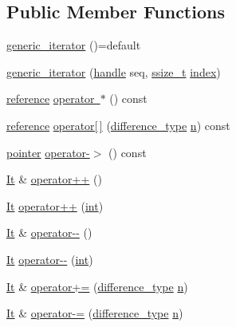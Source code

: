 \subsection*{Public Member Functions}
\begin{DoxyCompactItemize}
\item 
\mbox{\hyperlink{classgeneric__iterator_a38559672eba50c4e004eaf58aa45be41}{generic\+\_\+iterator}} ()=default
\item 
\mbox{\hyperlink{classgeneric__iterator_a68c753fced7ae65e4469cb2f6932b3a5}{generic\+\_\+iterator}} (\mbox{\hyperlink{classhandle}{handle}} seq, \mbox{\hyperlink{detail_2common_8h_ac430d16fc097b3bf0a7469cfd09decda}{ssize\+\_\+t}} \mbox{\hyperlink{_s_d_l__opengl__glext_8h_a57f14e05b1900f16a2da82ade47d0c6d}{index}})
\item 
\mbox{\hyperlink{classgeneric__iterator_aed22b28672b10453f89e239e55277808}{reference}} \mbox{\hyperlink{classgeneric__iterator_a96ea2ff0696f9179c069fe2caa87584e}{operator $\ast$}} () const
\item 
\mbox{\hyperlink{classgeneric__iterator_aed22b28672b10453f89e239e55277808}{reference}} \mbox{\hyperlink{classgeneric__iterator_aa0918f810b09d39e43ab8df9f3661379}{operator\mbox{[}$\,$\mbox{]}}} (\mbox{\hyperlink{classgeneric__iterator_a307cd6eddc16127eb873d76bcfc07233}{difference\+\_\+type}} \mbox{\hyperlink{_s_d_l__opengl__glext_8h_ae2b4646468bc89d0ba646f5cf838e051}{n}}) const
\item 
\mbox{\hyperlink{classgeneric__iterator_ab1e9fe365dec39e05180fb7e1c153f2e}{pointer}} \mbox{\hyperlink{classgeneric__iterator_a9ea55fcb56d1658a69cb0eda30b8f6b5}{operator-\/$>$}} () const
\item 
\mbox{\hyperlink{classgeneric__iterator}{It}} \& \mbox{\hyperlink{classgeneric__iterator_a5ba4cfe9ca5d4dd478e9025b24b417d5}{operator++}} ()
\item 
\mbox{\hyperlink{classgeneric__iterator}{It}} \mbox{\hyperlink{classgeneric__iterator_aa1914566d242ab0db2be3e8e73e04ec2}{operator++}} (\mbox{\hyperlink{warnings_8h_a74f207b5aa4ba51c3a2ad59b219a423b}{int}})
\item 
\mbox{\hyperlink{classgeneric__iterator}{It}} \& \mbox{\hyperlink{classgeneric__iterator_af39d6b4728e3cadca95e673cd31b836e}{operator-\/-\/}} ()
\item 
\mbox{\hyperlink{classgeneric__iterator}{It}} \mbox{\hyperlink{classgeneric__iterator_a85925b5b5a1eb238a8bf1214f5ca5742}{operator-\/-\/}} (\mbox{\hyperlink{warnings_8h_a74f207b5aa4ba51c3a2ad59b219a423b}{int}})
\item 
\mbox{\hyperlink{classgeneric__iterator}{It}} \& \mbox{\hyperlink{classgeneric__iterator_a06340dad4d45248a6ae5b9648ab6b1ad}{operator+=}} (\mbox{\hyperlink{classgeneric__iterator_a307cd6eddc16127eb873d76bcfc07233}{difference\+\_\+type}} \mbox{\hyperlink{_s_d_l__opengl__glext_8h_ae2b4646468bc89d0ba646f5cf838e051}{n}})
\item 
\mbox{\hyperlink{classgeneric__iterator}{It}} \& \mbox{\hyperlink{classgeneric__iterator_ae292e23fb6750598d209dac5f3a41f55}{operator-\/=}} (\mbox{\hyperlink{classgeneric__iterator_a307cd6eddc16127eb873d76bcfc07233}{difference\+\_\+type}} \mbox{\hyperlink{_s_d_l__opengl__glext_8h_ae2b4646468bc89d0ba646f5cf838e051}{n}})
\end{DoxyCompactItemize}
